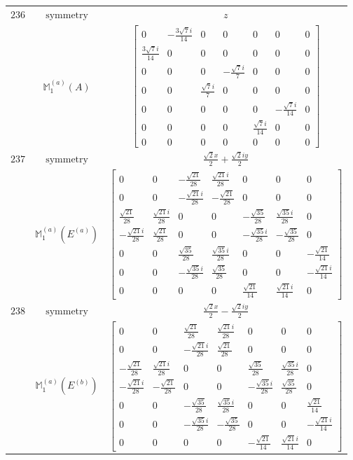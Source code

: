\documentclass[fleqn,8pt,landscape]{jsarticle}
\begin{document}
\begin{longtable}{ccc}
$ 236 $ & $ \text{symmetry} $ & $ z $ \\
$  $ & $ \mathbb{M}_{1}^{(a)}(A) $ & $ \begin{bmatrix} 0 & - \frac{3 \sqrt{7} i}{14} & 0 & 0 & 0 & 0 & 0 \\ \frac{3 \sqrt{7} i}{14} & 0 & 0 & 0 & 0 & 0 & 0 \\ 0 & 0 & 0 & - \frac{\sqrt{7} i}{7} & 0 & 0 & 0 \\ 0 & 0 & \frac{\sqrt{7} i}{7} & 0 & 0 & 0 & 0 \\ 0 & 0 & 0 & 0 & 0 & - \frac{\sqrt{7} i}{14} & 0 \\ 0 & 0 & 0 & 0 & \frac{\sqrt{7} i}{14} & 0 & 0 \\ 0 & 0 & 0 & 0 & 0 & 0 & 0 \end{bmatrix} $ \\ \hline
$ 237 $ & $ \text{symmetry} $ & $ \frac{\sqrt{2} x}{2} + \frac{\sqrt{2} i y}{2} $ \\
$  $ & $ \mathbb{M}_{1}^{(a)}(E^{(a)}) $ & $ \begin{bmatrix} 0 & 0 & - \frac{\sqrt{21}}{28} & \frac{\sqrt{21} i}{28} & 0 & 0 & 0 \\ 0 & 0 & - \frac{\sqrt{21} i}{28} & - \frac{\sqrt{21}}{28} & 0 & 0 & 0 \\ \frac{\sqrt{21}}{28} & \frac{\sqrt{21} i}{28} & 0 & 0 & - \frac{\sqrt{35}}{28} & \frac{\sqrt{35} i}{28} & 0 \\ - \frac{\sqrt{21} i}{28} & \frac{\sqrt{21}}{28} & 0 & 0 & - \frac{\sqrt{35} i}{28} & - \frac{\sqrt{35}}{28} & 0 \\ 0 & 0 & \frac{\sqrt{35}}{28} & \frac{\sqrt{35} i}{28} & 0 & 0 & - \frac{\sqrt{21}}{14} \\ 0 & 0 & - \frac{\sqrt{35} i}{28} & \frac{\sqrt{35}}{28} & 0 & 0 & - \frac{\sqrt{21} i}{14} \\ 0 & 0 & 0 & 0 & \frac{\sqrt{21}}{14} & \frac{\sqrt{21} i}{14} & 0 \end{bmatrix} $ \\ \hline
$ 238 $ & $ \text{symmetry} $ & $ \frac{\sqrt{2} x}{2} - \frac{\sqrt{2} i y}{2} $ \\
$  $ & $ \mathbb{M}_{1}^{(a)}(E^{(b)}) $ & $ \begin{bmatrix} 0 & 0 & \frac{\sqrt{21}}{28} & \frac{\sqrt{21} i}{28} & 0 & 0 & 0 \\ 0 & 0 & - \frac{\sqrt{21} i}{28} & \frac{\sqrt{21}}{28} & 0 & 0 & 0 \\ - \frac{\sqrt{21}}{28} & \frac{\sqrt{21} i}{28} & 0 & 0 & \frac{\sqrt{35}}{28} & \frac{\sqrt{35} i}{28} & 0 \\ - \frac{\sqrt{21} i}{28} & - \frac{\sqrt{21}}{28} & 0 & 0 & - \frac{\sqrt{35} i}{28} & \frac{\sqrt{35}}{28} & 0 \\ 0 & 0 & - \frac{\sqrt{35}}{28} & \frac{\sqrt{35} i}{28} & 0 & 0 & \frac{\sqrt{21}}{14} \\ 0 & 0 & - \frac{\sqrt{35} i}{28} & - \frac{\sqrt{35}}{28} & 0 & 0 & - \frac{\sqrt{21} i}{14} \\ 0 & 0 & 0 & 0 & - \frac{\sqrt{21}}{14} & \frac{\sqrt{21} i}{14} & 0 \end{bmatrix} $ \\ \hline

\end{longtable}
\end{document}
